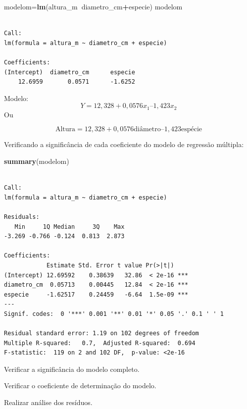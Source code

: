 \documentclass[12pt,brazil,oneside]{book}
\newenvironment{Shaded}{\begin{snugshade}}{\end{snugshade}}
\newcommand{\KeywordTok}[1]{\textcolor[rgb]{0.13,0.29,0.53}{\textbf{#1}}}
\newcommand{\NormalTok}[1]{#1}
\newcommand{\OperatorTok}[1]{\textcolor[rgb]{0.81,0.36,0.00}{\textbf{#1}}}
\begin{document}
\begin{Shaded}
\begin{Highlighting}[]
\NormalTok{modelom=}\KeywordTok{lm}\NormalTok{(altura_m}\OperatorTok{~}\NormalTok{diametro_cm}\OperatorTok{+}\NormalTok{especie) }
\NormalTok{modelom}
\end{Highlighting}
\end{Shaded}

\begin{verbatim}

Call:
lm(formula = altura_m ~ diametro_cm + especie)

Coefficients:
(Intercept)  diametro_cm      especie  
    12.6959       0.0571      -1.6252  
\end{verbatim}

Modelo: \[
Y = 12,328 + 0,0576 x_1 – 1,423 x_2
\] Ou

\[
\text{Altura} = 12,328 + 0,0576\text{diâmetro} – 1,423\text{espécie}
\]

Verificando a significância de cada coeficiente do modelo de regressão
múltipla:

\begin{Shaded}
\begin{Highlighting}[]
\KeywordTok{summary}\NormalTok{(modelom)}
\end{Highlighting}
\end{Shaded}

\begin{verbatim}

Call:
lm(formula = altura_m ~ diametro_cm + especie)

Residuals:
   Min     1Q Median     3Q    Max 
-3.269 -0.766 -0.124  0.813  2.873 

Coefficients:
            Estimate Std. Error t value Pr(>|t|)    
(Intercept) 12.69592    0.38639   32.86  < 2e-16 ***
diametro_cm  0.05713    0.00445   12.84  < 2e-16 ***
especie     -1.62517    0.24459   -6.64  1.5e-09 ***
---
Signif. codes:  0 '***' 0.001 '**' 0.01 '*' 0.05 '.' 0.1 ' ' 1

Residual standard error: 1.19 on 102 degrees of freedom
Multiple R-squared:   0.7,  Adjusted R-squared:  0.694 
F-statistic:  119 on 2 and 102 DF,  p-value: <2e-16
\end{verbatim}

Verificar a significância do modelo completo.

Verificar o coeficiente de determinação do modelo.

Realizar análise dos resíduos.
\end{document}
